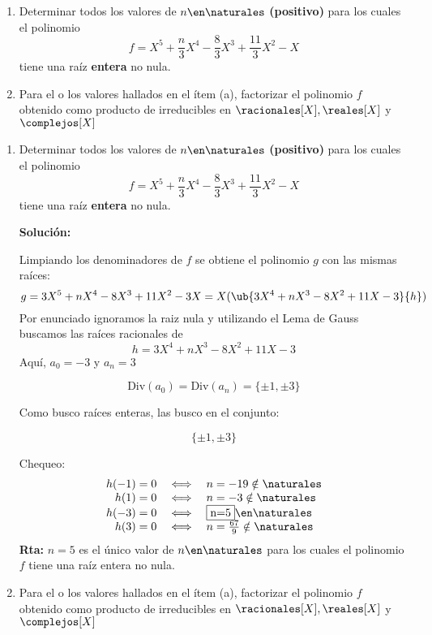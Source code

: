\begin{enunciado}{\ejExtra}
  \begin{enumerate}[label=\alph*)]
    \item
          Determinar todos los valores de $n\en\naturales$ \textbf{(positivo)} para los cuales el polinomio
          $$
            f=X^5 + \frac{n}{3}X^4 - \frac{8}{3}X^3 + \frac{11}{3}X^2 - X
          $$
          tiene una raíz \textbf{entera} no nula.
    \item
          Para el o los valores hallados en el ítem (a), factorizar el polinomio $f$ obtenido como producto de irreducibles en $\racionales[X],\reales[X]$ y $\complejos[X]$
  \end{enumerate}
\end{enunciado}

\begin{enumerate}[label=\alph*)]
  \item
        Determinar todos los valores de $n\en\naturales$ \textbf{(positivo)} para los cuales el polinomio
        $$
          f=X^5 + \frac{n}{3}X^4 - \frac{8}{3}X^3 + \frac{11}{3}X^2 - X
        $$
        tiene una raíz \textbf{entera} no nula.\medskip

        \textbf{Solución:}\par
        Limpiando los denominadores de $f$ se obtiene el polinomio $g$ con las mismas raíces:
        $$
          g=3X^5 + nX^4 - 8X^3 + 11X^2 - 3X= X(\ub{3X^4 + nX^3 - 8X^2 + 11X - 3}{h})
        $$
        Por enunciado ignoramos la raiz nula y utilizando el Lema de Gauss buscamos las raíces racionales de
        $$
          h=3X^4 + nX^3 - 8X^2 + 11X - 3
        $$
        Aquí, $a_0=-3$ y $a_n=3$\par
        $$
          \text{Div}(a_0)=\text{Div}(a_n)=\{\pm1,\pm3\}
        $$

        Como busco raíces enteras, las busco en el conjunto:

        $$
          \{ \pm1,\pm3 \}
        $$

        Chequeo:
        $$
          \begin{array}{rcl}
            h(-1)=0 & \iff & n=-19 \notin \naturales          \\
            h(1)=0  & \iff & n=-3 \notin \naturales           \\
            h(-3)=0 & \iff & \fbox{n=5} \en \naturales        \\
            h(3)=0  & \iff & n=\frac{67}{9} \notin \naturales
          \end{array}
        $$
        \textbf{Rta:} $n=5$ es el único valor de $n\en\naturales$ para los cuales el polinomio $f$ tiene una raíz entera no nula.\par
  \item
        Para el o los valores hallados en el ítem (a), factorizar el polinomio $f$
        obtenido como producto de irreducibles en $\racionales[X],\reales[X]$ y $\complejos[X]$ \par


\end{enumerate}
